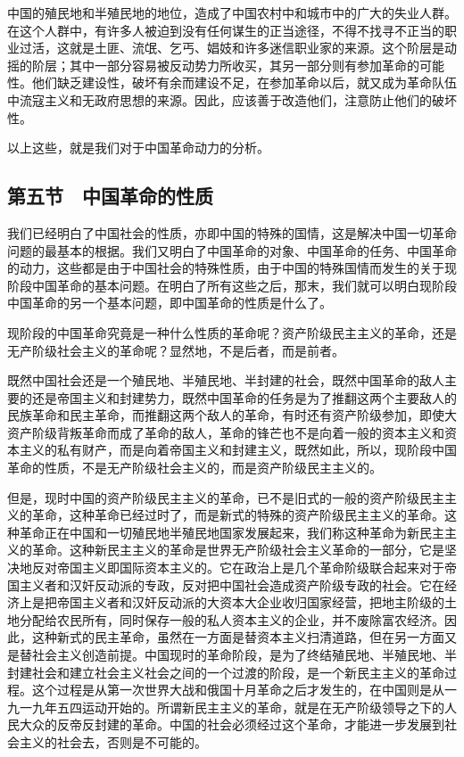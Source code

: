 中国的殖民地和半殖民地的地位，造成了中国农村中和城市中的广大的失业人群。在这个人群中，有许多人被迫到没有任何谋生的正当途径，不得不找寻不正当的职业过活，这就是土匪、流氓、乞丐、娼妓和许多迷信职业家的来源。这个阶层是动摇的阶层；其中一部分容易被反动势力所收买，其另一部分则有参加革命的可能性。他们缺乏建设性，破坏有余而建设不足，在参加革命以后，就又成为革命队伍中流寇主义和无政府思想的来源。因此，应该善于改造他们，注意防止他们的破坏性。

以上这些，就是我们对于中国革命动力的分析。

\subsection{第五节　中国革命的性质}

我们已经明白了中国社会的性质，亦即中国的特殊的国情，这是解决中国一切革命问题的最基本的根据。我们又明白了中国革命的对象、中国革命的任务、中国革命的动力，这些都是由于中国社会的特殊性质，由于中国的特殊国情而发生的关于现阶段中国革命的基本问题。在明白了所有这些之后，那末，我们就可以明白现阶段中国革命的另一个基本问题，即中国革命的性质是什么了。

现阶段的中国革命究竟是一种什么性质的革命呢？资产阶级民主主义的革命，还是无产阶级社会主义的革命呢？显然地，不是后者，而是前者。

既然中国社会还是一个殖民地、半殖民地、半封建的社会，既然中国革命的敌人主要的还是帝国主义和封建势力，既然中国革命的任务是为了推翻这两个主要敌人的民族革命和民主革命，而推翻这两个敌人的革命，有时还有资产阶级参加，即使大资产阶级背叛革命而成了革命的敌人，革命的锋芒也不是向着一般的资本主义和资本主义的私有财产，而是向着帝国主义和封建主义，既然如此，所以，现阶段中国革命的性质，不是无产阶级社会主义的，而是资产阶级民主主义的。

但是，现时中国的资产阶级民主主义的革命，已不是旧式的一般的资产阶级民主主义的革命，这种革命已经过时了，而是新式的特殊的资产阶级民主主义的革命。这种革命正在中国和一切殖民地半殖民地国家发展起来，我们称这种革命为新民主主义的革命。这种新民主主义的革命是世界无产阶级社会主义革命的一部分，它是坚决地反对帝国主义即国际资本主义的。它在政治上是几个革命阶级联合起来对于帝国主义者和汉奸反动派的专政，反对把中国社会造成资产阶级专政的社会。它在经济上是把帝国主义者和汉奸反动派的大资本大企业收归国家经营，把地主阶级的土地分配给农民所有，同时保存一般的私人资本主义的企业，并不废除富农经济。因此，这种新式的民主革命，虽然在一方面是替资本主义扫清道路，但在另一方面又是替社会主义创造前提。中国现时的革命阶段，是为了终结殖民地、半殖民地、半封建社会和建立社会主义社会之间的一个过渡的阶段，是一个新民主主义的革命过程。这个过程是从第一次世界大战和俄国十月革命之后才发生的，在中国则是从一九一九年五四运动开始的。所谓新民主主义的革命，就是在无产阶级领导之下的人民大众的反帝反封建的革命。中国的社会必须经过这个革命，才能进一步发展到社会主义的社会去，否则是不可能的。

